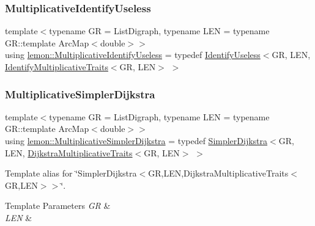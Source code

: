 \mbox{\label{namespacelemon_a228c186b3cf4726455a5f4930d89b9cd}} 
\subsubsection{\texorpdfstring{Multiplicative\+Identify\+Useless}{MultiplicativeIdentifyUseless}}
{\footnotesize\ttfamily template$<$typename GR  = List\+Digraph, typename L\+EN  = typename G\+R\+::template Arc\+Map$<$double$>$$>$ \\
using \hyperlink{namespacelemon_a228c186b3cf4726455a5f4930d89b9cd}{lemon\+::\+Multiplicative\+Identify\+Useless} = typedef \hyperlink{classlemon_1_1_identify_useless}{Identify\+Useless}$<$GR, L\+EN, \hyperlink{structlemon_1_1_identify_multiplicative_traits}{Identify\+Multiplicative\+Traits}$<$GR, L\+EN$>$ $>$}

\mbox{\label{namespacelemon_af6f169c21619a4d51dcf5f33c3d5b1cb}} 
\subsubsection{\texorpdfstring{Multiplicative\+Simpler\+Dijkstra}{MultiplicativeSimplerDijkstra}}
{\footnotesize\ttfamily template$<$typename GR  = List\+Digraph, typename L\+EN  = typename G\+R\+::template Arc\+Map$<$double$>$$>$ \\
using \hyperlink{namespacelemon_af6f169c21619a4d51dcf5f33c3d5b1cb}{lemon\+::\+Multiplicative\+Simpler\+Dijkstra} = typedef \hyperlink{classlemon_1_1_simpler_dijkstra}{Simpler\+Dijkstra}$<$GR, L\+EN, \hyperlink{structlemon_1_1_dijkstra_multiplicative_traits}{Dijkstra\+Multiplicative\+Traits}$<$GR, L\+EN$>$ $>$}



Template alias for \char`\"{}\+Simpler\+Dijkstra$<$\+G\+R,\+L\+E\+N,\+Dijkstra\+Multiplicative\+Traits$<$\+G\+R,\+L\+E\+N$>$$>$\char`\"{}. 


\begin{DoxyTemplParams}{Template Parameters}
{\em GR} & \\
\hline
{\em L\+EN} & \\
\hline
\end{DoxyTemplParams}
